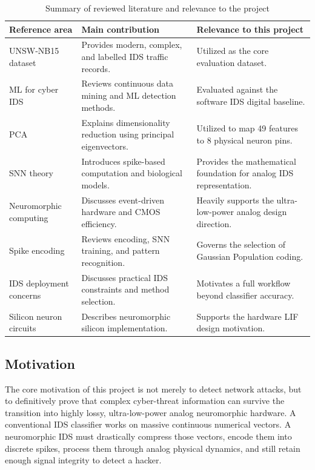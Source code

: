 \documentclass{ieeeaccess}
\begin{document}
\begin{table}[H]
\centering
\caption{Summary of reviewed literature and relevance to the project}
\label{tab:litreview}
\begin{tabular}{|p{}|p{}|p{}|}
\hline
\textbf{Reference area} & \textbf{Main contribution} & \textbf{Relevance to this project} \\
\hline
UNSW-NB15 dataset \cite{Moustafa2015} & Provides modern, complex, and labelled IDS traffic records. & Utilized as the core evaluation dataset. \\
\hline
ML for cyber IDS \cite{Buczak2016} & Reviews continuous data mining and ML detection methods. & Evaluated against the software IDS digital baseline. \\
\hline
PCA \cite{Jolliffe2016} & Explains dimensionality reduction using principal eigenvectors. & Utilized to map 49 features to 8 physical neuron pins. \\
\hline
SNN theory \cite{Maass1997,Gerstner2002} & Introduces spike-based computation and biological models. & Provides the mathematical foundation for analog IDS representation. \\
\hline
Neuromorphic computing \cite{Roy2019,Indiveri2011} & Discusses event-driven hardware and CMOS efficiency. & Heavily supports the ultra-low-power analog design direction. \\
\hline
Spike encoding \cite{Tavanaei2019,Ponulak2011,Diehl2015} & Reviews encoding, SNN training, and pattern recognition. & Governs the selection of Gaussian Population coding. \\
\hline
IDS deployment concerns \cite{Sommer2010,Liao2013} & Discusses practical IDS constraints and method selection. & Motivates a full workflow beyond classifier accuracy. \\
\hline
Silicon neuron circuits \cite{Indiveri2011} & Describes neuromorphic silicon implementation. & Supports the hardware LIF design motivation. \\
\hline
\end{tabular}
\end{table}

\subsection{Motivation}

The core motivation of this project is not merely to detect network attacks, but to definitively prove that complex cyber-threat information can survive the transition into highly lossy, ultra-low-power analog neuromorphic hardware. A conventional IDS classifier works on massive continuous numerical vectors. A neuromorphic IDS must drastically compress those vectors, encode them into discrete spikes, process them through analog physical dynamics, and still retain enough signal integrity to detect a hacker. 
\end{document}
